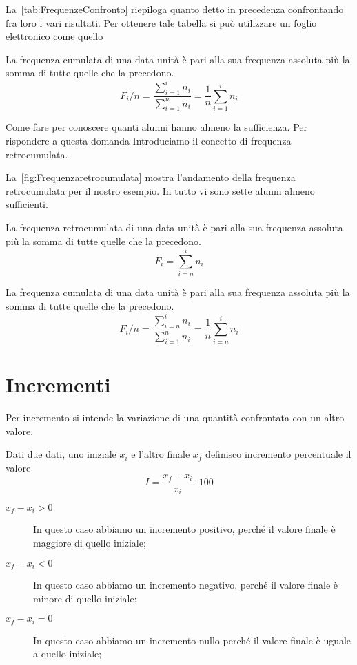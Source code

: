 La~\vref{tab:FrequenzeConfronto} riepiloga quanto detto in precedenza confrontando fra loro i vari risultati. Per ottenere tale tabella si può utilizzare un foglio elettronico come quello~
\begin{defn}
	La frequenza cumulata di una data unità è pari alla sua frequenza assoluta più la somma di tutte quelle che la  precedono.\[F_{i}/n=\dfrac{\sum_{i=1}^{i}n_{i}}{\sum_{i=1}^{n}n_{i}}=\dfrac{1}{n}\sum_{i=1}^{i}n_{i}\]
\end{defn}
Come fare per conoscere quanti alunni hanno almeno la sufficienza. Per rispondere a questa domanda Introduciamo il concetto di frequenza retrocumulata.\par  La~\vref{fig:Frequenzaretrocumulata} mostra l'andamento della frequenza retrocumulata per il nostro esempio. In tutto vi sono sette alunni almeno sufficienti.
\begin{defn}
	La frequenza retrocumulata di una data unità è pari alla sua frequenza assoluta più la somma di tutte quelle che la  precedono.\[F_{i}=\sum_{i=n}^{i}n_{i}\]
\end{defn}

\begin{defn}
	La frequenza cumulata di una data unità è pari alla sua frequenza assoluta più la somma di tutte quelle che la  precedono.\[F_{i}/n=\dfrac{\sum_{i=n}^{i}n_{i}}{\sum_{i=1}^{n}n_{i}}=\dfrac{1}{n}\sum_{i=n}^{i}n_{i}\]
\end{defn}
 \section{Incrementi }
 Per incremento si intende la variazione di una quantità confrontata con un altro valore.
 \begin{defn}
 	Dati due dati, uno iniziale $x_i$ e l'altro finale $x_f$ definisco incremento percentuale il valore  \[I=\dfrac{x_f-x_i}{x_i}\cdot 100\]
 \end{defn} 
 \begin{commento}[Confronti]
 	\begin{description}
 		\item[$x_f-x_i>0$] In questo caso abbiamo un incremento positivo, perché il valore finale è maggiore di quello iniziale;
 		\item[$x_f-x_i<0$] In questo caso abbiamo un incremento negativo, perché il valore finale è minore di quello  iniziale;
 		\item[$x_f-x_i=0$] In questo caso abbiamo un incremento nullo perché il valore finale è uguale a quello  iniziale;
 	\end{description}
 \end{commento}
